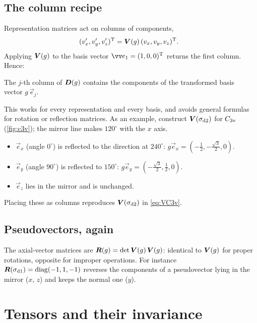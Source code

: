 \subsection{The column recipe}
Representation matrices act on columns of components,
\[
(v_x',v_y',v_z')^{\mathrm{T}}=\bm{V}(g)\,(v_x,v_y,v_z)^{\mathrm{T}}.
\]
Applying $\bm{V}(g)$ to the basis vector $\vec{e}_1=(1,0,0)\T$ returns the first
column. Hence:
\begin{keyresult}
The $j$-th column of $\bm{D}(g)$ contains the components of the transformed basis
vector $g\,\vec{e}_j$.
\end{keyresult}
This works for every representation and every basis, and avoids general formulas
for rotation or reflection matrices. As an example, construct
$\bm{V}(\sigma_{\mathrm{d}2})$ for $C_{3\mathrm{v}}$ (\cref{fig:c3v}); the mirror line makes
$120^\circ$ with the $x$ axis.
\begin{itemize}
\item $\vec{e}_x$ (angle $0^\circ$) is reflected to the direction at $240^\circ$:
      $g\vec{e}_x=(-\tfrac12,-\tfrac{\sqrt3}{2},0)$.
\item $\vec{e}_y$ (angle $90^\circ$) is reflected to $150^\circ$:
      $g\vec{e}_y=(-\tfrac{\sqrt3}{2},\tfrac12,0)$.
\item $\vec{e}_z$ lies in the mirror and is unchanged.
\end{itemize}
Placing these as columns reproduces $\bm{V}(\sigma_{\mathrm{d}2})$ in \eqref{eq:VC3v}.

\subsection{Pseudovectors, again}
The axial-vector matrices are $\bm{R}(g)=\det\bm{V}(g)\,\bm{V}(g)$: identical to
$\bm{V}(g)$ for proper rotations, opposite for improper operations. For instance
$\bm{R}(\sigma_{\mathrm{d}1})=\operatorname{diag}(-1,1,-1)$ reverses the components of a
pseudovector lying in the mirror ($x$, $z$) and keeps the normal one ($y$).

\section{Tensors and their invariance}

